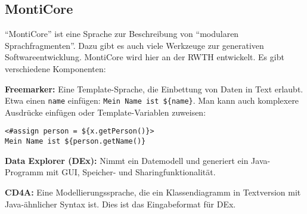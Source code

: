 \documentclass{panikzettel}
\begin{document}
\subsection{MontiCore}

``MontiCore'' ist eine Sprache zur Beschreibung von ``modularen Sprachfragmenten''. Dazu gibt es auch viele Werkzeuge zur generativen Softwareentwicklung. MontiCore wird hier an der RWTH entwickelt. Es gibt verschiedene Komponenten:

\textbf{Freemarker:} Eine Template-Sprache, die Einbettung von Daten in Text erlaubt. Etwa einen \lstinline{name} einfügen: \lstinline[mathescape=false]|Mein Name ist ${name}|. Man kann auch komplexere Ausdrücke einfügen oder Template-Variablen zuweisen: \begin{lstlisting}[mathescape=false]
<#assign person = ${x.getPerson()}>
Mein Name ist ${person.getName()}
\end{lstlisting}

\textbf{Data Explorer (DEx):} Nimmt ein Datemodell und generiert ein Java-Programm mit GUI, Speicher- und Sharingfunktionalität.

\textbf{CD4A:} Eine Modellierungssprache, die ein Klassendiagramm in Textversion mit Java-ähnlicher Syntax ist. Dies ist das Eingabeformat für DEx.

\hfill
{}
\end{document}
